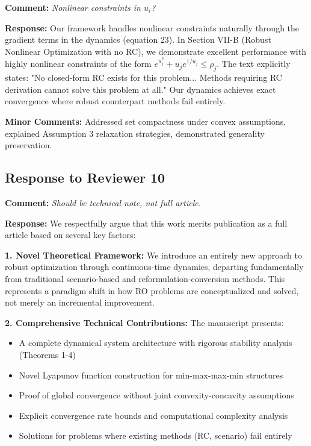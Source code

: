 \documentclass[journal,twoside,web]{ieeecolor}
\begin{document}
\textbf{Comment:} \textit{Nonlinear constraints in $u_i$?}

\textbf{Response:} Our framework handles nonlinear constraints naturally through the gradient terms in the dynamics (equation 23). In Section VII-B (Robust Nonlinear Optimization with no RC), we demonstrate excellent performance with highly nonlinear constraints of the form $e^{u_j^2}+u_j e^{1/u_j} \leq \rho_j$. The text explicitly states: "No closed-form RC exists for this problem... Methods requiring RC derivation cannot solve this problem at all." Our dynamics achieves exact convergence where robust counterpart methods fail entirely.

\textbf{Minor Comments:} Addressed set compactness under convex assumptions, explained Assumption 3 relaxation strategies, demonstrated generality preservation.

\subsection*{Response to Reviewer 10}

\textbf{Comment:} \textit{Should be technical note, not full article.}

\textbf{Response:} We respectfully argue that this work merits publication as a full article based on several key factors:

\textbf{1. Novel Theoretical Framework:} We introduce an entirely new approach to robust optimization through continuous-time dynamics, departing fundamentally from traditional scenario-based and reformulation-conversion methods. This represents a paradigm shift in how RO problems are conceptualized and solved, not merely an incremental improvement.

\textbf{2. Comprehensive Technical Contributions:} The manuscript presents:
\begin{itemize}
\item A complete dynamical system architecture with rigorous stability analysis (Theorems 1-4)
\item Novel Lyapunov function construction for min-max-max-min structures
\item Proof of global convergence without joint convexity-concavity assumptions
\item Explicit convergence rate bounds and computational complexity analysis
\item Solutions for problems where existing methods (RC, scenario) fail entirely
\end{itemize}
\end{document}
